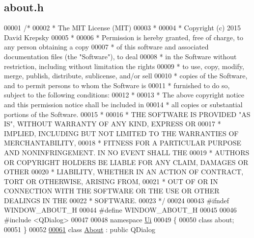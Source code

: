 \hypertarget{about_8h_source}{}\subsection{about.\+h}
\label{about_8h_source}

\begin{DoxyCode}
00001 \textcolor{comment}{/*}
00002 \textcolor{comment}{ * The MIT License (MIT)}
00003 \textcolor{comment}{ *}
00004 \textcolor{comment}{ * Copyright (c) 2015 David Krepsky}
00005 \textcolor{comment}{ *}
00006 \textcolor{comment}{ * Permission is hereby granted, free of charge, to any person obtaining a copy}
00007 \textcolor{comment}{ * of this software and associated documentation files (the "Software"), to deal}
00008 \textcolor{comment}{ * in the Software without restriction, including without limitation the rights}
00009 \textcolor{comment}{ * to use, copy, modify, merge, publish, distribute, sublicense, and/or sell}
00010 \textcolor{comment}{ * copies of the Software, and to permit persons to whom the Software is}
00011 \textcolor{comment}{ * furnished to do so, subject to the following conditions:}
00012 \textcolor{comment}{ *}
00013 \textcolor{comment}{ * The above copyright notice and this permission notice shall be included in}
00014 \textcolor{comment}{ * all copies or substantial portions of the Software.}
00015 \textcolor{comment}{ *}
00016 \textcolor{comment}{ * THE SOFTWARE IS PROVIDED "AS IS", WITHOUT WARRANTY OF ANY KIND, EXPRESS OR}
00017 \textcolor{comment}{ * IMPLIED, INCLUDING BUT NOT LIMITED TO THE WARRANTIES OF MERCHANTABILITY,}
00018 \textcolor{comment}{ * FITNESS FOR A PARTICULAR PURPOSE AND NONINFRINGEMENT. IN NO EVENT SHALL THE}
00019 \textcolor{comment}{ * AUTHORS OR COPYRIGHT HOLDERS BE LIABLE FOR ANY CLAIM, DAMAGES OR OTHER}
00020 \textcolor{comment}{ * LIABILITY, WHETHER IN AN ACTION OF CONTRACT, TORT OR OTHERWISE, ARISING FROM,}
00021 \textcolor{comment}{ * OUT OF OR IN CONNECTION WITH THE SOFTWARE OR THE USE OR OTHER DEALINGS IN THE}
00022 \textcolor{comment}{ * SOFTWARE.}
00023 \textcolor{comment}{ */}
00024 
00043 \textcolor{preprocessor}{#ifndef WINDOW\_ABOUT\_H}
00044 \textcolor{preprocessor}{#define WINDOW\_ABOUT\_H}
00045 
00046 \textcolor{preprocessor}{#include <QDialog>}
00047 
00048 \textcolor{keyword}{namespace }\hyperlink{namespace_ui}{Ui}
00049 \{
00050 \textcolor{keyword}{class }about;
00051 \}
00052 
\hypertarget{about_8h_source_l00061}{}\hyperlink{class_about}{00061} \textcolor{keyword}{class }\hyperlink{class_about}{About} : \textcolor{keyword}{public} QDialog

\end{DoxyCode}
